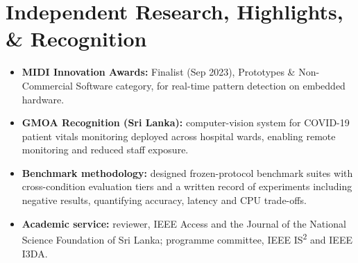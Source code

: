 \documentclass[11pt]{article}
\begin{document}
\vspace{-0.5em}
\section*{Independent Research, Highlights, \& Recognition}
\begin{itemize}[leftmargin=1.2em, itemsep=-0.25em]
    \item \textbf{MIDI Innovation Awards:} Finalist (Sep 2023), Prototypes \& Non-Commercial Software category, for real-time pattern detection on embedded hardware.
    \item \textbf{GMOA Recognition (Sri Lanka):} computer-vision system for COVID-19 patient vitals monitoring deployed across hospital wards, enabling remote monitoring and reduced staff exposure.
    \item \textbf{Benchmark methodology:} designed frozen-protocol benchmark suites with cross-condition evaluation tiers and a written record of experiments including negative results, quantifying accuracy, latency and CPU trade-offs.
    \item \textbf{Academic service:} reviewer, IEEE Access and the Journal of the National Science Foundation of Sri Lanka; programme committee, IEEE IS\textsuperscript{2} and IEEE I3DA.
\end{itemize}
\end{document}
